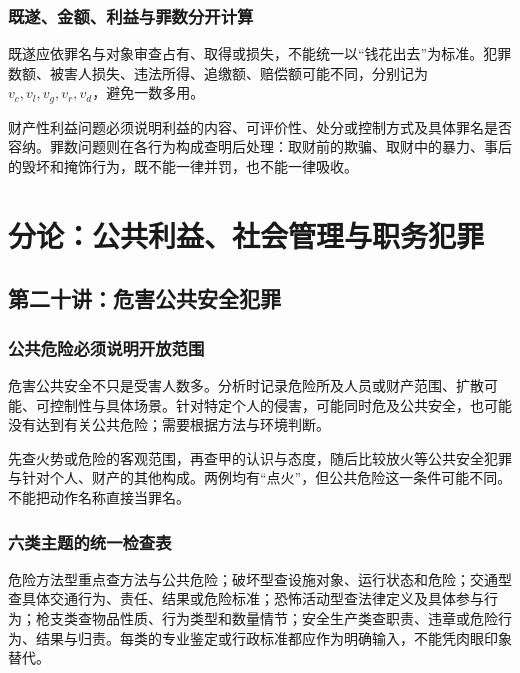 \subsection{既遂、金额、利益与罪数分开计算}
既遂应依罪名与对象审查占有、取得或损失，不能统一以“钱花出去”为标准。犯罪数额、被害人损失、违法所得、追缴额、赔偿额可能不同，分别记为$v_c,v_l,v_g,v_r,v_d$，避免一数多用。

财产性利益问题必须说明利益的内容、可评价性、处分或控制方式及具体罪名是否容纳。罪数问题则在各行为构成查明后处理：取财前的欺骗、取财中的暴力、事后的毁坏和掩饰行为，既不能一律并罚，也不能一律吸收。


\chapter{分论：公共利益、社会管理与职务犯罪}

\section{第二十讲：危害公共安全犯罪}
\subsection{公共危险必须说明开放范围}
危害公共安全不只是受害人数多。分析时记录危险所及人员或财产范围、扩散可能、可控制性与具体场景。针对特定个人的侵害，可能同时危及公共安全，也可能没有达到有关公共危险；需要根据方法与环境判断。


先查火势或危险的客观范围，再查甲的认识与态度，随后比较放火等公共安全犯罪与针对个人、财产的其他构成。两例均有“点火”，但公共危险这一条件可能不同。不能把动作名称直接当罪名。

\subsection{六类主题的统一检查表}
危险方法型重点查方法与公共危险；破坏型查设施对象、运行状态和危险；交通型查具体交通行为、责任、结果或危险标准；恐怖活动型查法律定义及具体参与行为；枪支类查物品性质、行为类型和数量情节；安全生产类查职责、违章或危险行为、结果与归责。每类的专业鉴定或行政标准都应作为明确输入，不能凭肉眼印象替代。

